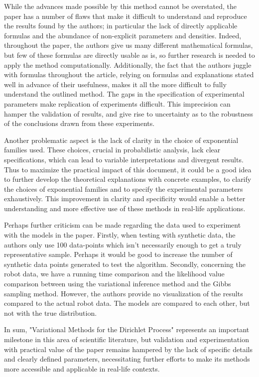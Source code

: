 \documentclass{article}
\begin{document}
While the advances made possible by this method cannot be overstated, the paper has a number of flaws that make it difficult to understand and reproduce the results found by the authors; in particular the lack of directly applicable formulas and the abundance of non-explicit parameters and densities. Indeed, throughout the paper, the authors give us many different mathematical formulas, but few of these formulas are directly usable as is, so further research is needed to apply the method computationally. Additionally, the fact that the authors juggle with formulas throughout the article, relying on formulas and explanations stated well in advance of their usefulness, makes it all the more difficult to fully understand the outlined method. The gaps in the specification of experimental parameters make replication of experiments difficult. This imprecision can hamper the validation of results, and give rise to uncertainty as to the robustness of the conclusions drawn from these experiments.

Another problematic aspect is the lack of clarity in the choice of exponential families used. These choices, crucial in probabilistic analysis, lack clear specifications, which can lead to variable interpretations and divergent results. Thus to maximize the practical impact of this document, it could be a good idea to further develop the theoretical explanations with concrete examples, to clarify the choices of exponential families and to specify the experimental parameters exhaustively. This improvement in clarity and specificity would enable a better understanding and more effective use of these methods in real-life applications.

Perhaps further criticism can be made regarding the data used to experiment with the models in the paper. Firstly, when testing with synthetic data, the authors  only use 100 data-points which isn't necessarily enough to get a truly representative sample. Perhaps it would be good to increase the number of synthetic data points generated to test the algorithm. Secondly, concerning the robot data, we have a running time comparison and the likelihood value comparison between using the variational inference method and the Gibbs sampling method. However, the authors provide no visualization of the results compared to the actual robot data. The models are compared to each other, but not with the true distribution.

In sum, "Variational Methods for the Dirichlet Process" represents an important milestone in this area of scientific literature, but validation and experimentation with practical value of the paper remains hampered by the lack of specific details and clearly defined parameters, necessitating further efforts to make its methods more accessible and applicable in real-life contexts.
\end{document}
